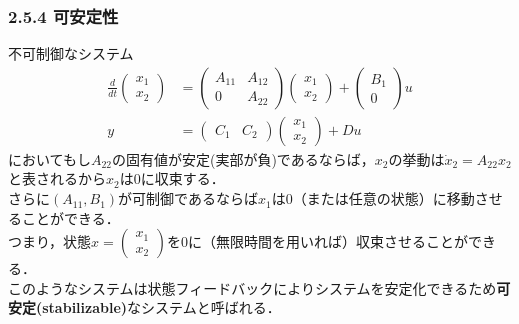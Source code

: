 \begin{frame}[t]
\frametitle{2.5.4 可安定性}
不可制御なシステム
\begin{align}
 \frac{d}{dt}
  \left(\begin{array}{c}
         {x}_1 \\
	 {x}_2 
	\end{array}\right)
  &=
  \left(\begin{array}{cc}
         {A}_{11} & {A}_{12} \\
	     0        & {A}_{22}
	\end{array}\right)
  \left(\begin{array}{c}
         {x}_1 \\
	 {x}_2 
	\end{array}\right)
  +
  \left(\begin{array}{c}
         {B}_1 \\
	 0
	\end{array}\right)
  u 
\\
 y &=
  \left(\begin{array}{cc}
         {C}_1 & {C}_2 
	\end{array}\right)
  \left(\begin{array}{c}
         {x}_1 \\
	 {x}_2 
	\end{array}\right)
  + D u
\end{align}
においてもし$A_{22}$の固有値が安定(実部が負)であるならば，$x_2$の挙動は$\dot{x}_2 = A_{22} x_2$と表されるから$x_2$は$0$に収束する．
\\[3mm]

さらに$(A_{11}, B_1)$が可制御であるならば$x_1$は$0$（または任意の状態）に移動させることができる．\\[3mm]

つまり，状態$x = \left(\begin{array}{c} {x}_1 \\ {x}_2 \end{array}\right)$を$0$に（無限時間を用いれば）収束させることができる．
\\[3mm]

このようなシステムは状態フィードバックによりシステムを安定化できるため{\bf 可安定(stabilizable)}なシステムと呼ばれる．

\end{frame}

